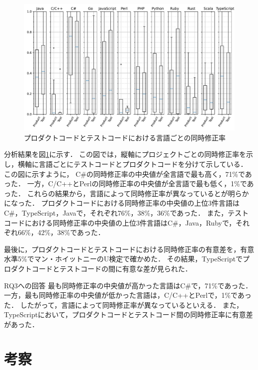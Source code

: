\documentclass[T,J]{fose}
\begin{document}
\begin{figure}[tb]
    \centering
    \includegraphics[width=\textwidth]{images/RQ3.pdf}
    \caption{プロダクトコードとテストコードにおける言語ごとの同時修正率}
    \label{fig:rateOfCoModifiedOfTestAndProduct}
\end{figure}

分析結果を図\ref{fig:rateOfCoModifiedOfTestAndProduct}に示す．
この図では，縦軸にプロジェクトごとの同時修正率を示し，横軸に言語ごとにテストコードとプロダクトコードを分けて示している．
この図に示すように，
C\#の同時修正率の中央値が全言語で最も高く，71\%であった．
一方，C/C++とPerlの同時修正率の中央値が全言語で最も低く，1\%であった．
これらの結果から，言語によって同時修正率が異なっているとが明らかになった．
プロダクトコードにおける同時修正率の中央値の上位3件言語はC\#，TypeScript，Javaで，それぞれ76\%，38\%，36\%であった．
また，テストコードにおける同時修正率の中央値の上位3件言語はC\#，Java，Rubyで，それぞれ66\%，42\%，38\%であった．

最後に，プロダクトコードとテストコードにおける同時修正率の有意差を，有意水準5\%でマン・ホイットニーのU検定で確かめた．
その結果，TypeScriptでプロダクトコードとテストコードの間に有意な差が見られた．



\begin{itembox}[l]{RQ3への回答}
最も同時修正率の中央値が高かった言語はC\#で，71\%であった．
一方，最も同時修正率の中央値が低かった言語は，C/C++とPerlで，1\%であった．
したがって，言語によって同時修正率が異なっているといえる．
また，TypeScriptにおいて，プロダクトコードとテストコード間の同時修正率に有意差があった．
\end{itembox}

\section{考察}
\end{document}
